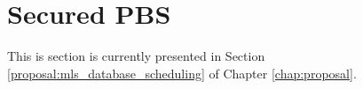 \section{Secured PBS}
\label{mls:secured_pbs}

This is section is currently presented in Section \ref{proposal:mls_database_scheduling} of Chapter \ref{chap:proposal}. 